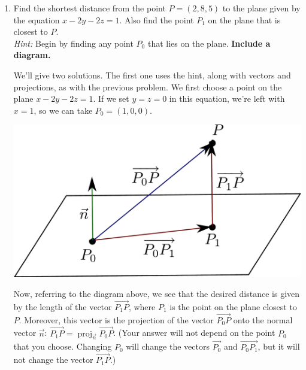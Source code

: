 \documentclass[12pt]{article}
\newcommand{\len}[1]{\lVert #1\rVert}
\DeclareMathOperator{\proj}{proj}
\begin{document}
\begin{enumerate}
{\bf Note:} if we wanted only the distance but didn't need to find the point $P_1$, we can notice (from -- guess what? -- the diagram!) that the distance from the point $P$ to the line is given by the length of the vector $\overrightarrow{P_1P}$, and that 
\[
\overrightarrow{P_1P} = \overrightarrow{P_0P}-\overrightarrow{P_0P_1} = \langle -1, 3, -1\rangle - \langle -2, 2, 0\rangle = \langle 1, 1,  -1\rangle,
\]
and thus $d = \len{\overrightarrow{P_1P}} = \sqrt{1^2+1^2+(-1)^2} = \sqrt{3}$.

\pagebreak


\item Find the shortest distance from the point $P=(2,8,5)$ to the plane given by the equation $x-2y-2z=1$. Also find the point $P_1$ on the plane that is closest to $P$. \\
{\em Hint:} Begin by finding any point $P_0$ that lies on the plane. {\bf Include a diagram.}

\bigskip

\begin{multicols}{2}
We'll give two solutions. The first one uses the hint, along with vectors and projections, as with the previous problem.  We first choose a point on the plane $x-2y-2z=1$. If we set $y=z=0$ in this equation, we're left with $x=1$, so we can take $P_0=(1,0,0)$.  
\columnbreak

\begin{center}
 \includegraphics[width=0.8\columnwidth]{WS3-4}
\end{center}
\end{multicols}
Now, referring to the diagram above, we see that the desired distance is given by the length of the vector $\overrightarrow{P_1P}$, where $P_1$ is the point on the plane closest to $P$. Moreover, this vector is the projection of the vector $\overrightarrow{P_0P}$ onto the normal vector $\vec{n}$: $\overrightarrow{P_1P} = \proj_{\vec{n}}\overrightarrow{P_0P}$. (Your answer will not depend on the point $P_0$ that you choose. Changing $P_0$ will change the vectors $\overrightarrow{P_0}$ and $\overrightarrow{P_0P_1}$, but it will not change the vector $\overrightarrow{P_1P}$.)


\end{enumerate}
\end{document}
